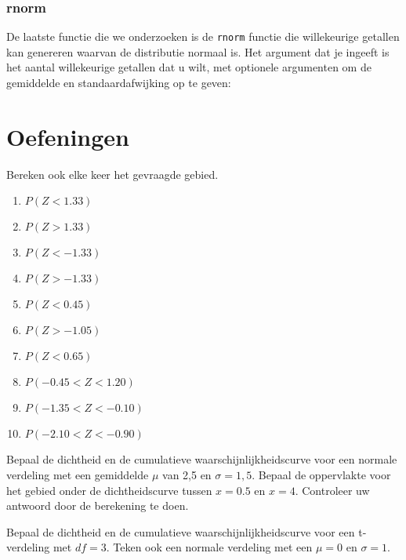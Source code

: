 \subsubsection{rnorm}


De laatste functie die we onderzoeken is de \texttt{rnorm} functie die willekeurige getallen kan genereren waarvan de distributie normaal is. Het argument dat je ingeeft is het aantal willekeurige getallen dat u wilt, met optionele argumenten om de gemiddelde en standaardafwijking op te geven:



\section{Oefeningen}
\label{sec:steekproefonderzoek-oefeningen}

\begin{exercise}
  \label{ex:prob-norm-dist}
  Bereken ook elke keer het gevraagde gebied.
  \begin{enumerate}[label=\alph*.]
    \item $P(Z < 1.33)$
    \item $P(Z > 1.33)$
    \item $P(Z < -1.33)$
    \item $P(Z > -1.33)$
    \item $P(Z < 0.45)$
    \item $P(Z > -1.05)$
    \item $P(Z < 0.65)$
    \item $P(-0.45 < Z < 1.20)$
    \item $P(-1.35 < Z < -0.10)$
    \item $P(-2.10 < Z < -0.90)$
  \end{enumerate}
\end{exercise}

\begin{exercise}
	Bepaal de dichtheid en de cumulatieve waarschijnlijkheidscurve voor een normale verdeling met een gemiddelde $\mu$
	van 2,5 en $\sigma = 1,5$. Bepaal de oppervlakte voor het gebied onder de dichtheidscurve tussen
	$x = 0.5$ en $x = 4$. Controleer uw antwoord door de berekening te doen.
\end{exercise}

\begin{exercise}
	Bepaal de dichtheid en de cumulatieve waarschijnlijkheidscurve voor een t-verdeling met $df = 3$. Teken ook een normale verdeling met een $\mu = 0$  en $\sigma = 1$.
\end{exercise}

